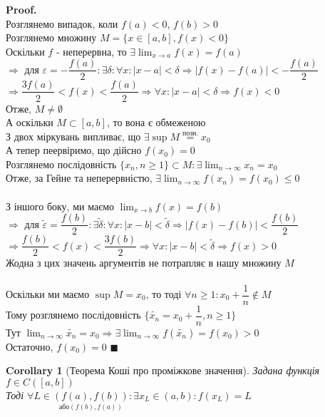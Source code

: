 \documentclass[a4paper, 14pt]{extarticle}
\def\huge{\displaystyle}
\theoremstyle{theoremdd}
\theoremstyle{theoremdd}
\theoremstyle{theoremdd}
\theoremstyle{theoremdd}
\theoremstyle{theoremdd}
\theoremstyle{theoremdd}
\theoremstyle{theoremdd}
\theoremstyle{theoremdd}
\newtheorem{corollary}[theorem]{Corollary}
\newenvironment{pf}{\vspace*{-3mm} \textbf{Proof. \\}}{$\blacksquare$}
\begin{document}
\begin{pf}
Розглянемо випадок, коли $f(a) < 0$, $f(b) > 0$\\
Розглянемо множину $M= \{x \in [a,b], f(x) < 0\}$\\
Оскільки $f$ - неперервна, то $\huge \exists \lim_{x \to a} f(x) = f(a)$\\
$\Rightarrow$ для $\varepsilon = -\dfrac{f(a)}{2}: \exists \delta: \forall x: |x-a|<\delta \Rightarrow |f(x)-f(a)|< -\dfrac{f(a)}{2}$\\
$\Rightarrow \dfrac{3f(a)}{2} < f(x) < \dfrac{f(a)}{2} \Rightarrow \forall x: |x-a|<\delta \Rightarrow f(x) < 0$\\
Отже, $M \neq \emptyset$\\
А оскільки $M \subset [a,b]$, то вона є обмеженою\\
З двох міркувань випливає, що $\exists \sup M \overset{\textrm{позн.}}{=} x_0$\\
А тепер пеервіримо, що дійсно $f(x_0) = 0$\\
Розглянемо послідовність $\{x_n, n \geq 1\} \subset M: \exists \huge \lim_{n \to \infty} x_n = x_0$\\
Отже, за Гейне та неперервністю, $\huge \exists \lim_{n \to \infty} f(x_n) = f(x_0) \leq 0$
\\
\\
З іншого боку, ми маємо $\huge \lim_{x \to b} f(x) = f(b)$\\
$\Rightarrow$ для $\tilde{\varepsilon} = \dfrac{f(b)}{2}: \exists \tilde{\delta}: \forall x: |x-b| < \tilde{\delta} \Rightarrow |f(x)-f(b)|<\dfrac{f(b)}{2}$\\
$\Rightarrow \dfrac{f(b)}{2} < f(x) < \dfrac{3f(b)}{2} \Rightarrow \forall x: |x-b| < \tilde{\delta} \Rightarrow f(x) > 0$\\
Жодна з цих значень аргументів не потрапляє в нашу множину $M$\\
\\
Оскільки ми маємо $\sup M = x_0$, то тоді $\forall n \geq 1: x_0 + \dfrac{1}{n} \not\in M$\\
Тому розглянемо послідовність $\{\tilde{x_n} = x_0 + \dfrac{1}{n}, n \geq 1\}$\\
Тут $\huge \lim_{n \to \infty} \tilde{x_n} = x_0 \Rightarrow \exists \lim_{n \to \infty} f(\tilde{x_n}) = f(x_0) > 0$\\
Остаточно, $f(x_0) = 0$
\end{pf}

\begin{corollary}[Теорема Коші про проміжкове значення]
Задана функція $f \in C([a,b])$\\
Тоді $\forall L \in \underset{\textrm{або} (f(b),f(a))}{(f(a),f(b))}: \exists x_L \in (a,b): f(x_L) = L$\\
\end{corollary}
\end{document}
